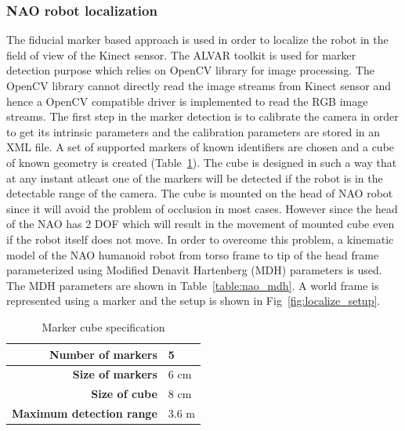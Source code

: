 \subsubsection{NAO robot localization}
The fiducial marker based approach is used in order to localize the robot in the field of view of the Kinect sensor. The ALVAR \cite{ALVAR} toolkit is used for marker detection purpose which relies on OpenCV library \cite{bradski2000opencv} for image processing. The OpenCV library cannot directly read the image streams from Kinect sensor and hence a OpenCV compatible driver is implemented to read the RGB image streams. The first step in the marker detection is to calibrate the camera in order to get its intrinsic parameters and the calibration parameters are stored in an XML file. A set of supported markers of known identifiers are chosen and a cube of known geometry is created (Table~\ref{table:cube_spec}). The cube is designed in such a way that at any instant atleast one of the markers will be detected if the robot is in the detectable range of the camera. The cube is mounted on the head of NAO robot since it will avoid the problem of occlusion in most cases. However since the head of the NAO has 2 DOF which will result in the movement of mounted cube even if the robot itself does not move. In order to overcome this problem, a kinematic model of the NAO humanoid robot from torso frame to tip of the head frame parameterized using Modified Denavit Hartenberg (MDH) \cite{khalil2004modeling} parameters is used. The MDH parameters are shown in Table~\ref{table:nao_mdh}. A world frame is represented using a marker and the setup is shown in Fig~\ref{fig:localize_setup}.
\begin{table}[H]
\centering
\caption{Marker cube specification}
\label{table:cube_spec}
\begin{tabular}{|r|l|}
\hline
  \textbf{Number of markers}  & 5
  \tabularnewline \hline
  \textbf{Size of markers}  & 6 cm
                                          \tabularnewline\hline
  \textbf{Size of cube}  & 8 cm
                                          \tabularnewline\hline
  \textbf{Maximum detection range}  & 3.6 m                                          
                                          \tabularnewline\hline                    
\end{tabular}
\end{table}
